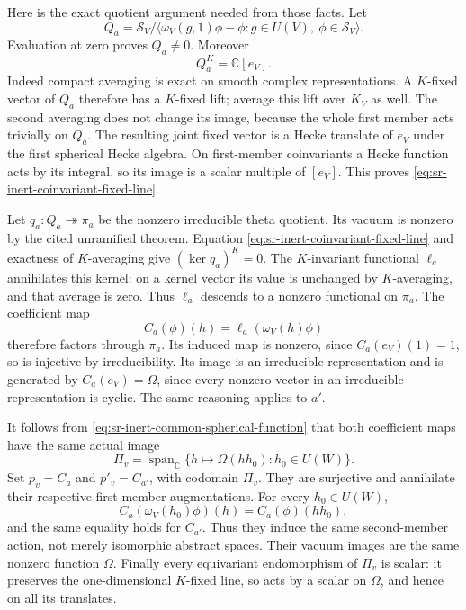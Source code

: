 Here is the exact quotient argument needed from those facts.
Let
\[
 Q_a=\mathcal S_V/
    \langle\omega_V(g,1)\phi-\phi:g\in U(V),\ \phi\in\mathcal S_V\rangle .
\]
Evaluation at zero proves \(Q_a\ne0\).
Moreover
\begin{equation}\label{eq:sr-inert-coinvariant-fixed-line}
                            Q_a^K=\mathbb C[e_V].
\end{equation}
Indeed compact averaging is exact on smooth complex
representations. A \(K\)-fixed vector of \(Q_a\) therefore
has a \(K\)-fixed lift; average this lift over \(K_V\) as well.
The second averaging does not change its image, because the
whole first member acts trivially on \(Q_a\).
The resulting joint fixed vector is a Hecke translate of
\(e_V\) under the first spherical Hecke algebra.
On first-member coinvariants a Hecke function acts by
its integral, so its image is a scalar multiple of \([e_V]\).
This proves \eqref{eq:sr-inert-coinvariant-fixed-line}.

Let \(q_a:Q_a\twoheadrightarrow\pi_a\) be the nonzero
irreducible theta quotient. Its vacuum is nonzero by the cited
unramified theorem. Equation
\eqref{eq:sr-inert-coinvariant-fixed-line} and exactness of
\(K\)-averaging give \((\ker q_a)^K=0\).
The \(K\)-invariant functional \(\ell_a\) annihilates this
kernel: on a kernel vector its value is unchanged by
\(K\)-averaging, and that average is zero.
Thus \(\ell_a\) descends to a nonzero functional on \(\pi_a\).
The coefficient map
\[
 C_a(\phi)(h)=\ell_a(\omega_V(h)\phi)
\]
therefore factors through \(\pi_a\). Its induced map is
nonzero, since \(C_a(e_V)(1)=1\), so is injective by
irreducibility. Its image is an irreducible representation
and is generated by \(C_a(e_V)=\Omega\), since every nonzero
vector in an irreducible representation is cyclic.
The same reasoning applies to \(a'\).

It follows from \eqref{eq:sr-inert-common-spherical-function}
that both coefficient maps have the same actual image
\[
            \Pi_v=
              \operatorname{span}_{\mathbb C}
                 \{h\longmapsto\Omega(hh_0):h_0\in U(W)\}.
\]
Set \(p_v=C_a\) and \(p'_v=C_{a'}\), with codomain \(\Pi_v\).
They are surjective and annihilate their respective
first-member augmentations. For every \(h_0\in U(W)\),
\[
 C_a(\omega_V(h_0)\phi)(h)=C_a(\phi)(hh_0),
\]
and the same equality holds for \(C_{a'}\).
Thus they induce the same second-member action, not merely
isomorphic abstract spaces. Their vacuum images are the
same nonzero function \(\Omega\). Finally every equivariant
endomorphism of \(\Pi_v\) is scalar: it preserves the
one-dimensional \(K\)-fixed line, so acts by a scalar on
\(\Omega\), and hence on all its translates.

